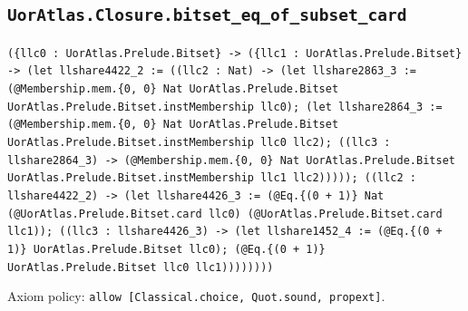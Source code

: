 \documentclass[11pt]{article}
\begin{document}
\subsection*{\texttt{UorAtlas.Closure.bitset\_eq\_of\_subset\_card}}
\noindent\texttt{(\{llc0 : UorAtlas.Prelude.Bitset\} -> (\{llc1 : UorAtlas.Prelude.Bitset\} -> (let llshare4422\_2 := ((llc2 : Nat) -> (let llshare2863\_3 := (@Membership.mem.\{0, 0\} Nat UorAtlas.Prelude.Bitset UorAtlas.Prelude.Bitset.instMembership llc0); (let llshare2864\_3 := (@Membership.mem.\{0, 0\} Nat UorAtlas.Prelude.Bitset UorAtlas.Prelude.Bitset.instMembership llc0 llc2); ((llc3 : llshare2864\_3) -> (@Membership.mem.\{0, 0\} Nat UorAtlas.Prelude.Bitset UorAtlas.Prelude.Bitset.instMembership llc1 llc2))))); ((llc2 : llshare4422\_2) -> (let llshare4426\_3 := (@Eq.\{(0 + 1)\} Nat (@UorAtlas.Prelude.Bitset.card llc0) (@UorAtlas.Prelude.Bitset.card llc1)); ((llc3 : llshare4426\_3) -> (let llshare1452\_4 := (@Eq.\{(0 + 1)\} UorAtlas.Prelude.Bitset llc0); (@Eq.\{(0 + 1)\} UorAtlas.Prelude.Bitset llc0 llc1))))))))}\par
\noindent Axiom policy: \texttt{allow [Classical.choice, Quot.sound, propext]}.\par
\end{document}
